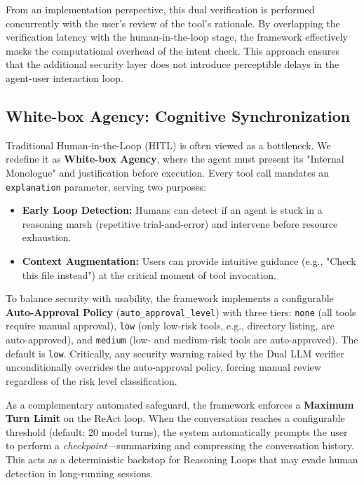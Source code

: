 \documentclass[conference]{IEEEtran}
\begin{document}
From an implementation perspective, this dual verification is performed concurrently with the user's review of the tool's rationale. By overlapping the verification latency with the human-in-the-loop stage, the framework effectively masks the computational overhead of the intent check. This approach ensures that the additional security layer does not introduce perceptible delays in the agent-user interaction loop.

\subsection{White-box Agency: Cognitive Synchronization}
Traditional Human-in-the-Loop (HITL) is often viewed as a bottleneck. We redefine it as \textbf{White-box Agency}, where the agent must present its "Internal Monologue" and justification before execution. Every tool call mandates an \texttt{explanation} parameter, serving two purposes:
\begin{itemize}
    \item \textbf{Early Loop Detection:} Humans can detect if an agent is stuck in a reasoning marsh (repetitive trial-and-error) and intervene before resource exhaustion.
    \item \textbf{Context Augmentation:} Users can provide intuitive guidance (e.g., "Check this file instead") at the critical moment of tool invocation.
\end{itemize}

To balance security with usability, the framework implements a configurable \textbf{Auto-Approval Policy} (\texttt{auto\_approval\_level}) with three tiers: \texttt{none} (all tools require manual approval), \texttt{low} (only low-risk tools, e.g., directory listing, are auto-approved), and \texttt{medium} (low- and medium-risk tools are auto-approved). The default is \texttt{low}. Critically, any security warning raised by the Dual LLM verifier unconditionally overrides the auto-approval policy, forcing manual review regardless of the risk level classification.

As a complementary automated safeguard, the framework enforces a \textbf{Maximum Turn Limit} on the ReAct loop. When the conversation reaches a configurable threshold (default: 20 model turns), the system automatically prompts the user to perform a \textit{checkpoint}---summarizing and compressing the conversation history. This acts as a deterministic backstop for Reasoning Loops that may evade human detection in long-running sessions.
\end{document}
